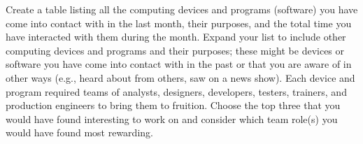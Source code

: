 \begin{ex}
	Create a table listing all the computing devices and programs (software) you have come into contact with in the last month, their purposes, and the total time you have interacted with them during the month. Expand your list to include other computing devices and programs and their purposes; these might be devices or software you have come into contact with in the past or that you are aware of in other ways (e.g., heard about from others, saw on a news show). Each device and program required teams of analysts, designers, developers, testers, trainers, and production engineers to bring them to fruition. Choose the top three that you would have found interesting to work on and consider which team role(s) you would have found most rewarding.
	 
\end{ex}
